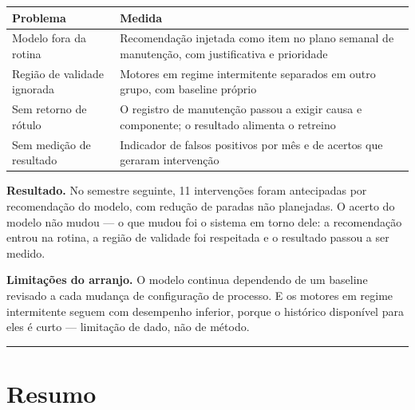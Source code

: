 \begin{longtable}[]{@{}
  >{\raggedright\arraybackslash}p{}
  >{\raggedright\arraybackslash}p{}@{}}
\toprule\noalign{}
\begin{minipage}[b]{\linewidth}\raggedright
Problema
\end{minipage} & \begin{minipage}[b]{\linewidth}\raggedright
Medida
\end{minipage} \\
\midrule\noalign{}
\endhead
\bottomrule\noalign{}
\endlastfoot
Modelo fora da rotina & Recomendação injetada como item no plano semanal de manutenção, com justificativa e prioridade \\
Região de validade ignorada & Motores em regime intermitente separados em outro grupo, com baseline próprio \\
Sem retorno de rótulo & O registro de manutenção passou a exigir causa e componente; o resultado alimenta o retreino \\
Sem medição de resultado & Indicador de falsos positivos por mês e de acertos que geraram intervenção \\
\end{longtable}

\textbf{Resultado.} No semestre seguinte, 11 intervenções foram antecipadas por recomendação do modelo, com
redução de paradas não planejadas. O acerto do modelo não mudou --- o que mudou foi o sistema em torno
dele: a recomendação entrou na rotina, a região de validade foi respeitada e o resultado passou a ser
medido.

\textbf{Limitações do arranjo.} O modelo continua dependendo de um baseline revisado a cada mudança de
configuração de processo. E os motores em regime intermitente seguem com desempenho inferior, porque
o histórico disponível para eles é curto --- limitação de dado, não de método.

\begin{center}\rule{0.5\linewidth}{0.5pt}\end{center}

\section{Resumo}\label{resumo}

